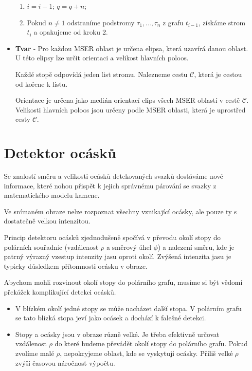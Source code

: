 \begin{itemize}
\begin{enumerate}
	\item $i = i+1$; $q = q+n$;
	\item Pokud $n \neq 1$ odstraníme podstromy $\tau_1,\dots,\tau_n$ z grafu $t_{i-1}$, získáme strom  $t_i$ a opakujeme od kroku $2$. 
	
\end{enumerate}	
	\item \textbf{Tvar} -  Pro každou MSER oblast je určena elipsa, která uzavírá danou oblast. U této elipsy lze určit orientaci a velikost hlavních poloos. 
	
	Každé stopě odpovídá jeden list stromu. Nalezneme cestu $\mathcal{C}$, která je cestou od kořene k listu. 	
	
	Orientace je určena jako medián orientací elips všech MSER oblastí v cestě $\mathcal{C}$. Velikosti hlavních poloos jsou určeny podle MSER oblasti, která je uprostřed cesty $\mathcal{C}$.		
		
\end{itemize}

\newpage
	
\section{Detektor ocásků}
\label{sec:tails}
	Se znalostí směru a velikosti ocásků detekovaných svazků dostáváme nové informace, které nohou přispět k jejich správnému párování se svazky z matematického modelu kamene.
	
	Ve snímaném obraze nelze rozpoznat všechny vznikající ocásky, ale pouze ty s dostatečně velkou intenzitou.

	Princip detektoru ocásků zjednodušeně spočívá v převodu okolí stopy do polárních souřadnic (vzdálenost $\rho$ a směrový úhel $\phi$) a nalezení směru, kde je patrný výrazný vzestup intenzity jasu oproti okolí. Zvýšená intenzita jasu je typicky důsledkem přítomnosti ocásku v obraze. 
	
	Abychom mohli rozvinout okolí stopy do polárního grafu, musíme si být vědomi překážek komplikující detekci ocásků.
	  
	 \begin{itemize}	 	
	 	\item V blízkém okolí jedné stopy se může nacházet další stopa. V polárním grafu se tato blízká stopa jeví jako ocásek a dochází k falešné detekci.	
	 	\item Stopy a ocásky jsou v obraze různě velké. Je třeba efektivně určovat vzdálenost $\rho$ do které budeme převádět okolí stopy do polárního grafu. Pokud zvolíme malé $\rho$, nepokryjeme oblast, kde se vyskytují ocásky. Příliš velké $\rho$ zvýší časovou náročnost výpočtu.   	
	\end{itemize}
	

